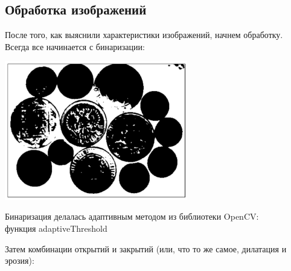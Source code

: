 \documentclass[12pt, a4paper]{article}
\begin{document}
		\subsection{Обработка изображений}
			После того, как выяснили характеристики изображений, начнем обработку. Всегда все начинается с бинаризации:
			\begin{center}
				\includegraphics[width=8cm]{Money_1_bin.png}
			\end{center}
			
			Бинаризация делалась адаптивным методом из библиотеки OpenCV: \\
			функция adaptiveThreshold

			Затем комбинации открытий и закрытий (или, что то же самое, дилатация и эрозия):
			
\end{document}
